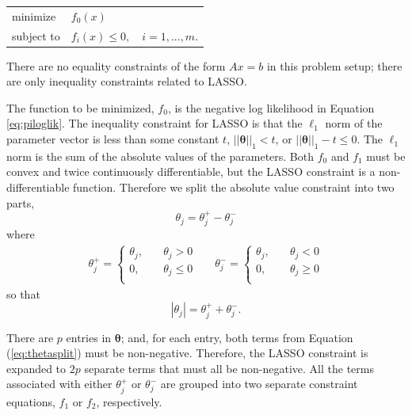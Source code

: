 \documentclass[11pt]{article}
\begin{document}
\begin{center}\begin{tabular}{ll}
minimize &$f_0(x)$\\
subject to &$f_i(x) \leq 0, \quad i = 1, ..., m$.
\end{tabular}\end{center}

There are no equality constraints of the form $Ax = b$ in this problem setup; there are only inequality constraints related to LASSO.

The function to be minimized, $f_0$, is the negative log likelihood in Equation \ref{eq:piloglik}. The inequality constraint for LASSO is that the $\ell_1$ norm of the parameter vector is less than some constant $t$, $||\boldsymbol{\theta}||_1 < t$, or $||\boldsymbol{\theta}||_1 - t \leq 0$. The $\ell_1$ norm is the sum of the absolute values of the parameters. Both $f_0$ and $f_1$ must be convex and twice continuously differentiable, but the LASSO constraint is a non-differentiable function. Therefore we split the absolute value constraint into two parts,
\begin{equation}\theta_j = \theta_j^+ - \theta_j^-\label{eq:thetasplit}\end{equation} where 
\begin{align}
\theta_j^+ = \left\{\begin{array}{ll}\theta_j, \quad& \theta_j > 0\\0, \quad& \theta_j \leq 0\\\end{array}\right.&&
\theta_j^- = \left\{\begin{array}{ll}\theta_j, \quad& \theta_j < 0\\0, \quad& \theta_j \geq 0\\\end{array}\right.
\label{eg:thetadefs}\end{align}
so that
$$|\theta_j| = \theta_j^+ + \theta_j^-.$$

There are $p$ entries in $\boldsymbol{\theta}$; and, for each entry, both terms from Equation (\ref{eq:thetasplit}) must be non-negative. Therefore, the LASSO constraint is expanded to $2p$ separate terms that must all be non-negative. All the terms associated with either $\theta_j^+$ or $\theta_j^-$ are grouped into two separate constraint equations, $f_1$ or $f_2$, respectively. 
\end{document}
